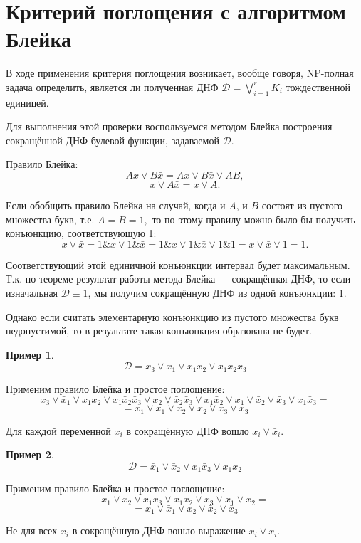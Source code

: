 \documentclass[12pt,a4paper,oneside,fleqn,leqno]{article}
\theoremstyle{definition}
\newtheorem{example}{Пример}%
\begin{document}
	\section{Критерий поглощения с алгоритмом Блейка}
		В ходе применения критерия поглощения возникает, вообще говоря, NP-полная задача определить, является ли полученная ДНФ $\mathcal{D} = \bigvee\limits_{i = 1}^rK_i$ тождественной единицей.\par
		Для выполнения этой проверки воспользуемся методом Блейка построения сокращённой ДНФ булевой функции, задаваемой $\mathcal{D}.$\par
		Правило Блейка:
		$$
			Ax \vee B\bar{x} = Ax \vee B\bar{x} \vee AB,
		$$
		$$
			x \vee A\bar{x} = x \vee A.
		$$\par
		Если обобщить правило Блейка на случай, когда и $A$, и $B$ состоят из пустого множества букв, т.е. $A = B = 1,$ то по этому правилу можно было бы получить конъюнкцию, соответствующую 1:
		$$
			x \vee \bar{x} = 1\& x \vee 1\&\bar{x} = 1 \& x \vee 1\&\bar{x} \vee 1 \& 1 = x \vee \bar{x} \vee 1 = 1.
		$$\par
		Соответствующий этой единичной конъюнкции интервал будет максимальным. Т.к. по теореме результат работы метода Блейка --- сокращённая ДНФ, то если изначальная $\mathcal{D} \equiv 1$, мы получим сокращённую ДНФ из одной конъюнкции: 1.\par
		Однако если считать элементарную конъюнкцию из пустого множества букв недопустимой, то в результате такая конъюнкция образована не будет.
		\begin{example}
			$$
				\mathcal{D} = x_3 \vee \bar{x}_1 \vee x_1x_2 \vee x_1\bar{x}_2\bar{x}_3
			$$\par
			Применим правило Блейка и простое поглощение:
			$$
				x_3 \vee \bar{x}_1 \vee x_1x_2 \vee x_1\bar{x}_2\bar{x}_3 \vee x_2 \vee \bar{x}_2\bar{x}_3 \vee x_1\bar{x}_2 \vee x_1 \vee \bar{x}_2 \vee \bar{x}_3 \vee x_1\bar{x}_3 =
			$$
			$$
				= x_1 \vee \bar{x}_1 \vee x_2 \vee \bar{x}_2 \vee x_3 \vee \bar{x}_3
			$$\par
			Для каждой переменной $x_i$ в сокращённую ДНФ вошло $x_i \vee \bar{x}_i.$
		\end{example}
		\begin{example}
			$$
				\mathcal{D} = \bar{x}_1 \vee \bar{x}_2 \vee x_1\bar{x}_3 \vee x_1x_2
			$$\par
			Применим правило Блейка и простое поглощение:
			$$
				\bar{x}_1 \vee \bar{x}_2 \vee x_1\bar{x}_3 \vee x_1x_2 \vee \bar{x}_3 \vee x_1 \vee x_2 =
			$$
			$$
				= x_1 \vee \bar{x}_1  \vee x_2 \vee \bar{x}_2 \vee \bar{x}_3
			$$\par
			Не для всех $x_i$ в сокращённую ДНФ вошло выражение $x_i \vee \bar{x}_i.$
		\end{example}
\end{document}

